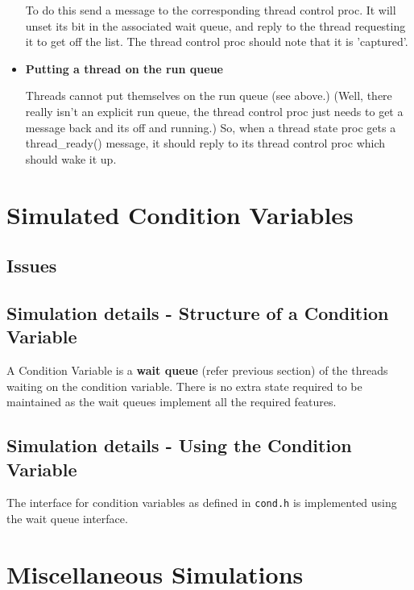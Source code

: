 \begin{itemize}
To do this send a message to the corresponding thread control proc.
It will unset its bit in the associated wait queue, and reply to the
thread requesting it to get off the list.  The thread control proc
should note that it is 'captured'.

\item {\bf Putting a thread on the run queue}

Threads cannot put themselves on the run queue (see above.)  (Well,
there really isn't an explicit run queue, the thread control proc just
needs to get a message back and its off and running.)  So, when a
thread state proc gets a thread_ready() message, it should reply to
its thread control proc which should wake it up.

\end{itemize}

\section{Simulated Condition Variables}

\subsection{Issues}

\subsection{Simulation details - Structure of a Condition Variable}

A Condition Variable is a {\bf wait queue} (refer previous section) of the
threads waiting on the condition variable. There is no extra state
required to be maintained as the wait queues implement all the
required features.


\subsection{Simulation details - Using the Condition Variable}

The interface for condition variables as defined in {\tt cond.h} is
implemented using the wait queue interface.


\section{Miscellaneous Simulations}

